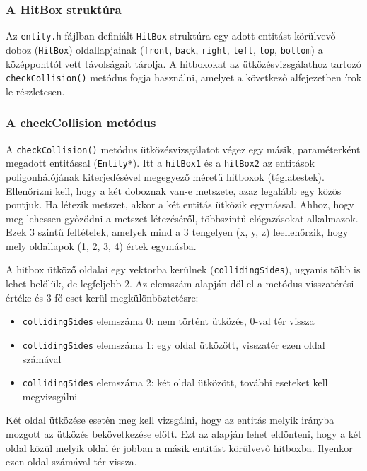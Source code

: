 \subsubsection{A HitBox struktúra}

Az \verb|entity.h| fájlban definiált \verb|HitBox| struktúra egy adott entitást körülvevő doboz (\verb|HitBox|) oldallapjainak (\verb|front|, \verb|back|, \verb|right|, \verb|left|, \verb|top|, \verb|bottom|) a középponttól vett távolságait tárolja. A hitboxokat az ütközésvizsgálathoz tartozó \verb|checkCollision()| metódus fogja használni, amelyet a következő alfejezetben írok le részletesen.

\subsubsection{A checkCollision metódus}

A \verb|checkCollision()| metódus ütközésvizsgálatot végez egy másik, paraméterként megadott entitással (\verb|Entity*|). Itt a \verb|hitBox1| és a \verb|hitBox2| az entitások poligonhálójának kiterjedésével megegyező méretű hitboxok (téglatestek). Ellenőrizni kell, hogy a két doboznak van-e metszete, azaz legalább egy közös pontjuk. Ha létezik metszet, akkor a két entitás ütközik egymással. Ahhoz, hogy meg lehessen győződni a metszet létezéséről, többszintű elágazásokat alkalmazok. Ezek 3 szintű feltételek, amelyek mind a 3 tengelyen (x, y, z) leellenőrzik, hogy mely oldallapok (1, 2, 3, 4) értek egymásba.

A hitbox ütköző oldalai egy vektorba kerülnek (\verb|collidingSides|), ugyanis több is lehet belőlük, de legfeljebb 2. Az elemszám alapján dől el a metódus visszatérési értéke és 3 fő eset kerül megkülönböztetésre:

\begin{itemize}
	\item \verb|collidingSides| elemszáma 0: nem történt ütközés, 0-val tér vissza
	\item \verb|collidingSides| elemszáma 1: egy oldal ütközött, visszatér ezen oldal számával
	\item \verb|collidingSides| elemszáma 2: két oldal ütközött, további eseteket kell megvizsgálni
\end{itemize}

Két oldal ütközése esetén meg kell vizsgálni, hogy az entitás melyik irányba mozgott az ütközés bekövetkezése előtt. Ezt az alapján lehet eldönteni, hogy a két oldal közül melyik oldal ér jobban a másik entitást körülvevő hitboxba. Ilyenkor ezen oldal számával tér vissza.

